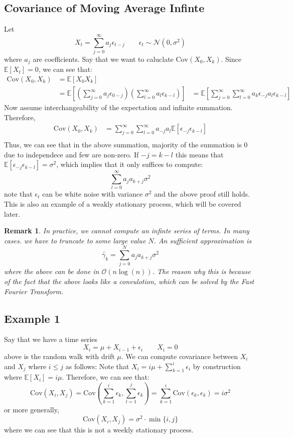 \documentclass[12pt]{article}
\newtheorem{remark}{Remark}
\newcommand{\bigO}[1]{\mathcal{O}\left(#1\right)}
\newcommand{\E}{\mathbb{E}}
\newcommand{\Cov}{\text{Cov}}
\begin{document}
\subsection{Covariance of Moving Average Infinte}
Let 
\[
	X_t = \sum_{j = 0}^\infty a_j \epsilon_{t - j} \qquad \epsilon_t \sim \mathcal{N}(0, \sigma^2)
\]
where $a_j$ are coefficients. Say that we want to caluclate $\Cov(X_0, X_k)$. Since $\E[X_t] = 0$, we can see that:
\begin{align*}
	\Cov(X_0, X_k) &= \E[X_0 X_k] \\ 
		       &= \E \left[ \left( \sum_{j = 0}^\infty a_j \epsilon_{0-j}\right)\left(\sum_{l = 0}^\infty a_l \epsilon_{k-l}\right)\right]
		       &= \E \left[ \sum_{j = 0}^\infty \sum_{l = 0}^\infty a_k \epsilon_{-j} a_l \epsilon_{k - l} \right]
\end{align*}
Now assume interchangeability of the expectation and infinite summation. Therefore, 
\begin{align*}
	\Cov(X_0, X_k) &= \sum_{j = 0}^\infty \sum_{l = 0}^\infty a_{-j}a_l \E[\epsilon_{-j}\epsilon_{k-l}]	\\
\end{align*}
Thus, we can see that in the above summation, majority of the summation is $0$ due to independece and few are non-zero. If $-j = k - l$ this means that $\E[\epsilon_{-j}\epsilon_{k - l}] = \sigma^2$, which implies that it only suffices to compute:
\[
	\sum_{l = 0}^\infty a_j a_{k+j} \sigma^2 
\]
note that $\epsilon_t$ can be white noise with variance $\sigma^2$ and the above proof still holds. This is also an example of a weakly stationary process, which will be covered later. 
\begin{remark}
	In practice, we cannot compute an infinte series of terms. In many cases. we have to truncate to some large value $N$. An sufficient approximation is 
	\[
		\tilde{\gamma_k} = \sum_{j = 0}^N a_j a_{k+j}\sigma^2
	\]
	where the above can be done in $\bigO{n\log(n)}$. The reason why this is because of the fact that the above looks like a convulotion, which can be solved by the Fast Fourier Transform. 
\end{remark}

\subsection{Example 1}
Say that we have a time series 
\[
	X_i = \mu + X_{i - 1} + \epsilon_i \qquad X_i = 0
\]
above is the random walk with drift $\mu$. We can compute covariance between $X_i$ and $X_j$ where $i \leq j$ as follows: Note that $X_i = i \mu + \sum_{k = 1}^i \epsilon_i$ by construction where $\E[X_i] = i \mu$. Therefore, we can see that:
\[
	\Cov(X_i, X_j) = \Cov \left( \sum_{k = 1}^i \epsilon_k, \sum_{l = 1}^j \epsilon_k\right) = \sum_{k = 1}^i \Cov \left(\epsilon_k, \epsilon_k \right) = i \sigma^2
\]
or more generally,
\[
	\Cov(X_i, X_j) = \sigma^2 \cdot \min \{i, j\}
\]
where we can see that this is not a weekly stationary process. 
\end{document}
